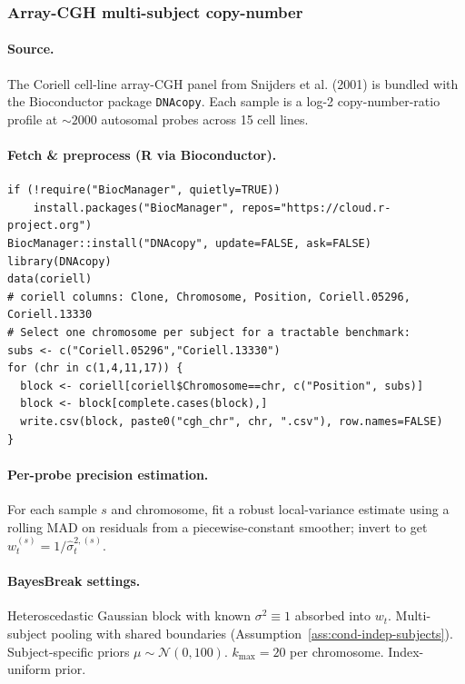 \subsubsection{Array-CGH multi-subject copy-number}
\label{app:real-data-cgh}

\paragraph{Source.}
The Coriell cell-line array-CGH panel from Snijders et al. (2001) is bundled with the
Bioconductor package \texttt{DNAcopy}. Each sample is a log-2 copy-number-ratio profile at
$\sim 2000$ autosomal probes across 15 cell lines.

\paragraph{Fetch \& preprocess (R via Bioconductor).}
\begin{verbatim}
if (!require("BiocManager", quietly=TRUE))
    install.packages("BiocManager", repos="https://cloud.r-project.org")
BiocManager::install("DNAcopy", update=FALSE, ask=FALSE)
library(DNAcopy)
data(coriell)
# coriell columns: Clone, Chromosome, Position, Coriell.05296, Coriell.13330
# Select one chromosome per subject for a tractable benchmark:
subs <- c("Coriell.05296","Coriell.13330")
for (chr in c(1,4,11,17)) {
  block <- coriell[coriell$Chromosome==chr, c("Position", subs)]
  block <- block[complete.cases(block),]
  write.csv(block, paste0("cgh_chr", chr, ".csv"), row.names=FALSE)
}
\end{verbatim}

\paragraph{Per-probe precision estimation.}
For each sample $s$ and chromosome, fit a robust local-variance estimate using a rolling MAD on
residuals from a piecewise-constant smoother; invert to get $w^{(s)}_t=1/\widehat\sigma_t^{2,(s)}$.

\paragraph{BayesBreak settings.}
Heteroscedastic Gaussian block with known $\sigma^2\equiv 1$ absorbed into $w_t$. Multi-subject
pooling with shared boundaries (Assumption~\ref{ass:cond-indep-subjects}). Subject-specific
priors $\mu\sim\mathcal{N}(0,100)$. $k_{\max}=20$ per chromosome. Index-uniform prior.


